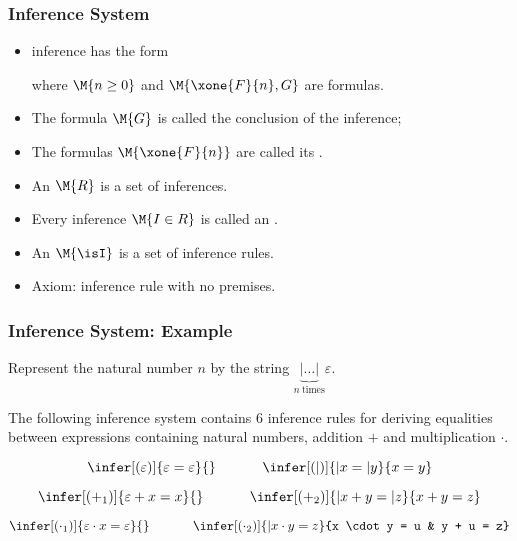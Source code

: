 
                        \begin{frame}\frametitle{Inference System}

\begin{itemize}
\item \alert{inference} has the form

where $\M{n \geq 0}$ and $\M{\xone{F}{n},G}$ are formulas. 
\item
The formula $\M{G}$ is called the \alert{conclusion} of the inference;
\item
The formulas $\M{\xone{F}{n}}$ are called its .
\item
An  $\M{R}$ is a set of
inferences. 
\item
Every inference $\M{I \in R}$ is called an 
.
\item
An  $\M{\isI}$
is a set of inference rules. 
\item \alert{Axiom:} inference rule with no premises.
\end{itemize}

                                \end{frame}


                        \begin{frame}\frametitle{Inference System: Example}

Represent the natural number $n$ by the string $\underbrace{| \ldots
  |}_{n~\mathrm{times}}\varepsilon$.

The following inference system contains 6 inference rules for deriving
equalities between expressions containing natural numbers, addition
$+$ and multiplication $\cdot$.

  \[
    \infer[(\varepsilon)]{\varepsilon = \varepsilon}{}
    ~~~~~~~~~~
    \infer[(|)]{|x = |y}{x = y}
 \]

  \[
    \infer[(+_1)]{\varepsilon + x = x}{}
    ~~~~~~~~~~
    \infer[(+_2)]{|x + y = |z}{x + y = z}
  \]

  \[
    \infer[(\cdot_1)]{\varepsilon \cdot x = \varepsilon}{}
    ~~~~~~~~~~
    \infer[(\cdot_2)]{|x \cdot y = z}{x \cdot y = u & y + u = z}
  \]


                               \end{frame}

